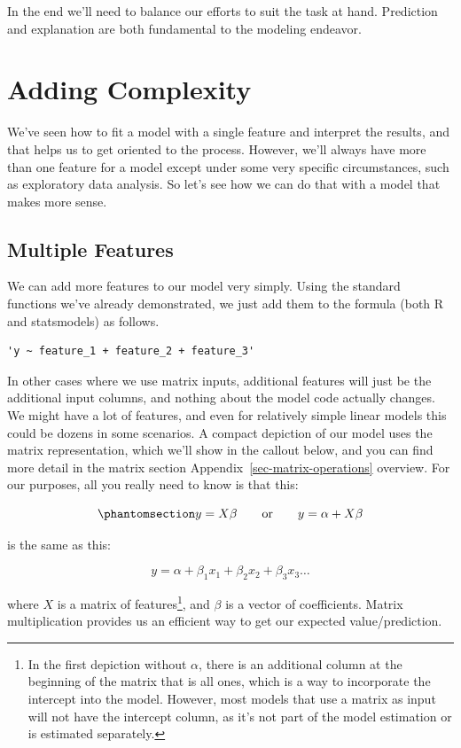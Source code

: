 \documentclass[
  letterpaper,
]{krantz}
\begin{document}
In the end we'll need to balance our efforts to suit the task at hand.
Prediction and explanation are both fundamental to the modeling
endeavor.

\section{Adding Complexity}\label{sec-lm-complexity}

We've seen how to fit a model with a single feature and interpret the
results, and that helps us to get oriented to the process. However,
we'll always have more than one feature for a model except under some
very specific circumstances, such as exploratory data analysis. So let's
see how we can do that with a model that makes more sense.

\subsection{Multiple Features}\label{sec-lm-multiple-features}

We can add more features to our model very simply. Using the standard
functions we've already demonstrated, we just add them to the formula
(both R and statsmodels) as follows.

\begin{verbatim}
'y ~ feature_1 + feature_2 + feature_3'
\end{verbatim}

In other cases where we use matrix inputs, additional features will just
be the additional input columns, and nothing about the model code
actually changes. We might have a lot of features, and even for
relatively simple linear models this could be dozens in some scenarios.
A compact depiction of our model uses the matrix representation, which
we'll show in the callout below, and you can find more detail in the
matrix section Appendix~\ref{sec-matrix-operations} overview. For our
purposes, all you really need to know is that this:

\begin{equation}\phantomsection\label{eq-lm-XB}{
y = X\beta\qquad  \textrm{or}\qquad y = \alpha + X\beta
}\end{equation}

is the same as this:

\[
y = \alpha + \beta_1 x_1 + \beta_2 x_2 + \beta_3 x_3 \dots
\]

where \(X\) is a matrix of features\footnote{In the first depiction
  without \(\alpha\), there is an additional column at the beginning of
  the matrix that is all ones, which is a way to incorporate the
  intercept into the model. However, most models that use a matrix as
  input will not have the intercept column, as it's not part of the
  model estimation or is estimated separately.}, and \(\beta\) is a
vector of coefficients. Matrix multiplication provides us an efficient
way to get our expected value/prediction.
\end{document}
